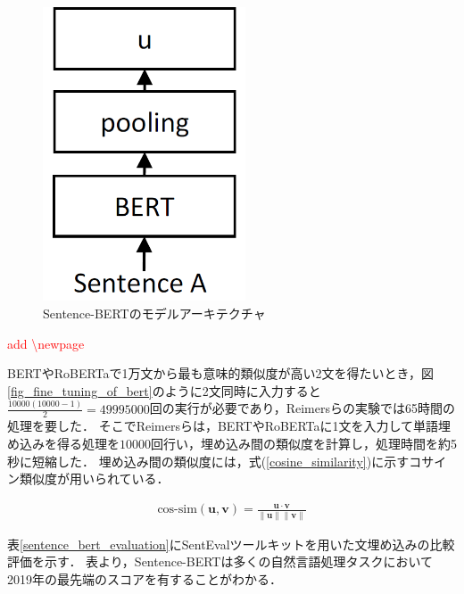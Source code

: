 \documentclass[12pt,a4j]{jreport}
\begin{document}


\begin{figure}[H]
	\centering
	\includegraphics[keepaspectratio, width=60mm]{img/sentence-bert.png}
	\caption{Sentence-BERTのモデルアーキテクチャ\protect\footnotemark[8]}
	\label{fig_sentence_bert}
\end{figure}

\textcolor{red}{add \textbackslash newpage}
\newpage

BERTやRoBERTaで1万文から最も意味的類似度が高い2文を得たいとき，図\ref{fig_fine_tuning_of_bert}のように2文同時に入力すると$\frac{10000(10000-1)}{2}=49995000$回の実行が必要であり，Reimersらの実験では65時間の処理を要した．
そこでReimersらは，BERTやRoBERTaに1文を入力して単語埋め込みを得る処理を$10000$回行い，埋め込み間の類似度を計算し，処理時間を約5秒に短縮した．
埋め込み間の類似度には，式(\ref{cosine_similarity})に示すコサイン類似度が用いられている．

\begin{align}
  \text{cos-sim}\left(\bm{u}, \bm{v}\right) = \frac{\bm{u} \cdot \bm{v}}{\|\bm{u}\|\|\bm{v}\|}
  \label{cosine_similarity}
\end{align}

表\ref{sentence_bert_evaluation}にSentEvalツールキットを用いた文埋め込みの比較評価を示す．
表より，Sentence-BERTは多くの自然言語処理タスクにおいて2019年の最先端のスコアを有することがわかる．
\end{document}
